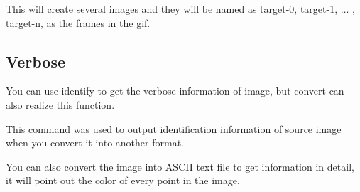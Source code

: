 \documentclass[12pt]{article}
\begin{document}
This will create several images and they will be named as target-0, target-1, $\dots$ , target-n, as the frames in the gif.

\subsection{Verbose}

You can use identify to get the verbose information of image, but convert can also realize this function.\vspace{5mm}

{\centering{}\par}\vspace{5mm}

This command was used to output identification information of source image when you convert it into another format.

You can also convert the image into ASCII text file to get information in detail, it will point out the color of every point in the image.
\end{document}
